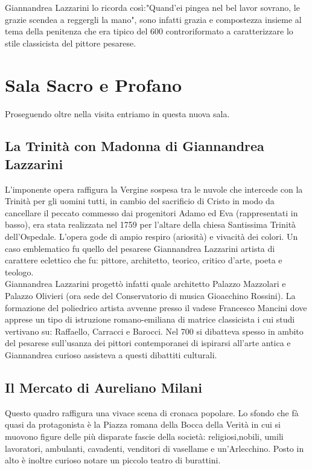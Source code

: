 \documentclass[hidelinks,12pt,a4paper]{article}
\begin{document}
\begin{flushleft}
			Giannandrea Lazzarini lo ricorda così:"Quand'ei pingea nel bel lavor sovrano, le grazie scendea a reggergli la mano", sono infatti grazia e compostezza insieme al tema della penitenza che era tipico del 600 controriformato a caratterizzare lo stile classicista del pittore pesarese.
	
			\section{Sala Sacro e Profano}
			Proseguendo oltre nella visita entriamo in questa nuova sala.
	
			\subsection{La Trinità con Madonna di Giannandrea Lazzarini}
			L'imponente opera raffigura la Vergine sospesa tra le nuvole che intercede con la Trinità per gli uomini tutti, in cambio del sacrificio di Cristo in modo da cancellare il peccato commesso dai progenitori Adamo ed Eva (rappresentati in basso), era stata realizzata nel 1759 per l'altare della chiesa Santissima Trinità dell'Ospedale. L'opera gode di ampio respiro (ariosità) e vivacità dei colori. Un caso emblematico fu quello del pesarese Giannandrea Lazzarini artista di carattere eclettico che fu: pittore, architetto, teorico, critico d'arte, poeta e teologo.\\
			Giannandrea Lazzarini progettò infatti quale architetto Palazzo Mazzolari e Palazzo Olivieri (ora sede del Conservatorio di musica Gioacchino Rossini). La formazione del poliedrico artista avvenne presso il vadese Francesco Mancini dove apprese un tipo di istruzione romano-emiliana di matrice classicista i cui studi vertivano su: Raffaello, Carracci e Barocci. Nel 700 si dibatteva spesso in ambito del pesarese sull'usanza dei pittori contemporanei di ispirarsi all'arte antica e Giannandrea curioso assisteva a questi dibattiti culturali.
	
			\subsection{Il Mercato di Aureliano Milani}
			Questo quadro raffigura una vivace scena di cronaca popolare. Lo sfondo che fà quasi da protagonista è la Piazza romana della Bocca della Verità in cui si muovono figure delle più disparate fascie della società: religiosi,nobili, umili lavoratori, ambulanti, cavadenti, venditori di vasellame e un'Arlecchino. Posto in alto è inoltre curioso notare un piccolo teatro di burattini.
	

\end{flushleft}
\end{document}
